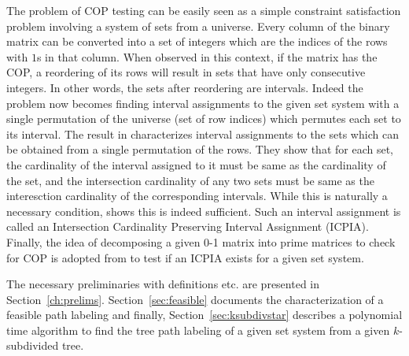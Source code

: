 \documentclass[MS]             %
              {iitmdiss_as}    %
\begin{document}
The problem of COP testing can be easily seen as a simple constraint
satisfaction problem involving a system of sets from a universe. Every
column of the binary matrix can be converted into a set of integers
which are the indices of the rows with $1$s in that column. When
observed in this context, if the matrix has the COP, a reordering of
its rows will result in sets that have only consecutive integers. In
other words, the sets after reordering are intervals. Indeed the
problem now becomes finding interval assignments to the given set
system \cite{nsnrs09} with a single permutation of the universe (set
of row indices) which permutes each set to its interval. The result in
\cite{nsnrs09} characterizes interval assignments to the sets which
can be obtained from a single permutation of the rows.  They show that
for each set, the cardinality of the interval assigned to it must be
same as the cardinality of the set, and the intersection cardinality
of any two sets must be same as the interesction cardinality of the
corresponding intervals.  While this is naturally a necessary
condition, \cite{nsnrs09} shows this is indeed sufficient.  Such an
interval assignment is called an Intersection Cardinality Preserving
Interval Assignment (ICPIA).  Finally, the idea of decomposing a given
0-1 matrix into prime matrices to check for COP is adopted from
\cite{wlh02} to test if an ICPIA exists for a given set system.

The necessary preliminaries with definitions
etc. are presented in
Section~\ref{ch:prelims}. Section~\ref{sec:feasible} documents the
characterization of a feasible path labeling and finally,
Section~\ref{sec:ksubdivstar} describes a polynomial time algorithm to
find the tree path labeling of a given set system from a given
$k$-subdivided tree.
\end{document}
